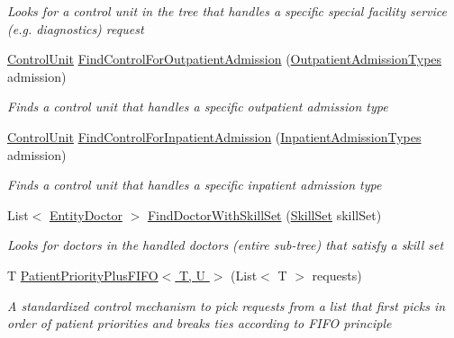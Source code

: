 \begin{DoxyCompactItemize}
\begin{DoxyCompactList}\small\item\em Looks for a control unit in the tree that handles a specific special facility service (e.\+g. diagnostics) request \end{DoxyCompactList}\item 
\hyperlink{class_simulation_core_1_1_h_c_c_m_elements_1_1_control_unit}{Control\+Unit} \hyperlink{class_general_health_care_elements_1_1_control_units_1_1_control_unit_health_care_ad0f906d7702255b27865b9bb06614735}{Find\+Control\+For\+Outpatient\+Admission} (\hyperlink{class_general_health_care_elements_1_1_treatment_admission_types_1_1_outpatient_admission_types}{Outpatient\+Admission\+Types} admission)
\begin{DoxyCompactList}\small\item\em Finds a control unit that handles a specific outpatient admission type \end{DoxyCompactList}\item 
\hyperlink{class_simulation_core_1_1_h_c_c_m_elements_1_1_control_unit}{Control\+Unit} \hyperlink{class_general_health_care_elements_1_1_control_units_1_1_control_unit_health_care_adb1cc86fe3a5fcfdab51e5bcb6a0ae27}{Find\+Control\+For\+Inpatient\+Admission} (\hyperlink{class_general_health_care_elements_1_1_treatment_admission_types_1_1_inpatient_admission_types}{Inpatient\+Admission\+Types} admission)
\begin{DoxyCompactList}\small\item\em Finds a control unit that handles a specific inpatient admission type \end{DoxyCompactList}\item 
List$<$ \hyperlink{class_general_health_care_elements_1_1_entities_1_1_entity_doctor}{Entity\+Doctor} $>$ \hyperlink{class_general_health_care_elements_1_1_control_units_1_1_control_unit_health_care_a435e7f22f6eeec96ad24eca32b23f252}{Find\+Doctor\+With\+Skill\+Set} (\hyperlink{class_simulation_core_1_1_h_c_c_m_elements_1_1_skill_set}{Skill\+Set} skill\+Set)
\begin{DoxyCompactList}\small\item\em Looks for doctors in the handled doctors (entire sub-\/tree) that satisfy a skill set \end{DoxyCompactList}\item 
T \hyperlink{class_general_health_care_elements_1_1_control_units_1_1_control_unit_health_care_aadacea5152f5f7dc4a8dfcb007c323db}{Patient\+Priority\+Plus\+F\+I\+F\+O$<$ T, U $>$} (List$<$ T $>$ requests)
\begin{DoxyCompactList}\small\item\em A standardized control mechanism to pick requests from a list that first picks in order of patient priorities and breaks ties according to F\+I\+FO principle \end{DoxyCompactList}\end{DoxyCompactItemize}
